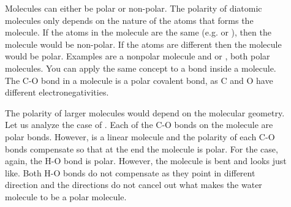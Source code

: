 \documentclass[main.tex]{subfiles}
\begin{document}
\begin{description}
\item[] Molecules can either be polar or non-polar. The polarity of diatomic molecules only depends on the nature of the atoms that forms the molecule. If the atoms in the molecule are the same (e.g.  or ), then the molecule would be non-polar. If the atoms are different then the molecule would be polar. Examples are  a nonpolar molecule and  or , both polar molecules. You can apply the same concept to a bond inside a molecule. The C-O bond in a  molecule is a polar covalent bond, as C and O have different electronegativities.
\item[] The polarity of larger molecules would depend on the molecular geometry. Let us analyze the case of . Each of the C-O bonds on the molecule are polar bonds. However,  is a linear molecule  \hspace{.07in}\hspace{.07in} and the polarity of each C-O bonds compensate so that at the end the molecule is polar. For the  case, again, the H-O bond is polar. However, the molecule is bent and looks just like\hspace{.05in}\hspace{.05in}. Both H-O bonds do not compensate as they point in different direction and the directions do not cancel out what makes the water molecule to be a polar molecule.





\end{description}
\end{document}
